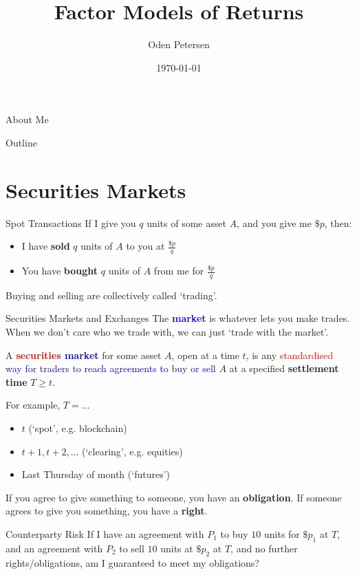\documentclass{beamer}
\title[Short Title]{Factor Models of Returns}
\author[Your Name]{Oden Petersen}
\date{\today}
\begin{document}
\begin{frame}
	\titlepage
\end{frame}

\begin{frame}{About Me}
\end{frame}

\begin{frame}{Outline}
	\tableofcontents
\end{frame}

\section{Securities Markets}

\begin{frame}{Spot Transactions}
	If I give you $q$ units of some asset $A$, and you give me $\$p$, then:
	\begin{itemize}
		\item I have \textbf{sold} $q$ units of $A$ to you at $\frac{\$p}{q}$
		\item You have \textbf{bought} $q$ units of $A$ from me for $\frac{\$p}{q}$
	\end{itemize}

	Buying and selling are collectively called `trading'.

\end{frame}

\begin{frame}{Securities Markets and Exchanges}
	The \textbf{\textcolor{blue}{market}} is whatever lets you make trades. When we don't care who we trade with, we can just `trade with the market'.

	A \textbf{\textcolor{red}{securities} \textcolor{blue}{market}} for some asset $A$, open at a time $t$, is any \textcolor{red}{standardised} \textcolor{blue}{way for traders to reach agreements to buy or sell} $A$ at a specified \textbf{settlement time} $T\geq t$.

	\pause

	For example, $T=\ldots$
	\begin{itemize}
		\item $t$ (`spot', e.g. blockchain)
		\item $t+1, t+2, \ldots$ (`clearing', e.g. equities)
		\item Last Thursday of month (`futures')
	\end{itemize}

	\pause
	If you agree to give something to someone, you have an \textbf{obligation}. If someone agrees to give you something, you have a \textbf{right}.

	\begin{block}{Counterparty Risk}
		If I have an agreement with $P_1$ to buy $10$ units for $\$p_1$ at $T$, and an agreement with $P_2$ to sell $10$ units at $\$p_2$ at $T$, and no further rights/obligations, am I guaranteed to meet my obligations?
	\end{block}
\end{frame}
\end{document}
